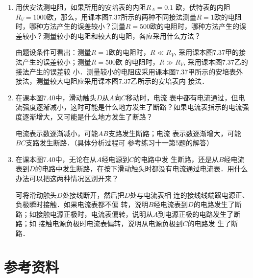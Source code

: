 \begin{enumerate}
\begin{solution}
\end{solution}

\item 用伏安法测电阻，如果所用的安培表的内阻$R_A=0.1$
欧，伏特表的内阻$R_V=1000$欧，那么，用课本图7.37所示的两种不同接法测量$R=1$欧的电阻时，哪种方法产生的误差较小？测量$R=500$欧的电阻时，哪种方法产生的误差较小？测量较小的电阻和较大的电阻，各应采用什么方法？

\begin{solution}
    由题设条件可看出：测量$R=1$欧的电阻时，$R\ll R_V$,
    采用课本图7.37甲的接法产生的误差较小；测量$R=500$欧
    的电阻时，$R\gg R_V$, 采用课本图7.37乙的接法产生的误差较
    小．测量较小的电阻应采用课本图7.37甲所示的安培表外
    接法，测量较大电阻应采用课本图7.37乙所示的安培表内
    接法．
\end{solution}

\item 在课本图7.40中，滑动触头$D$从$A$向$C$移动时，电流
表中都有电流通过，但电流强度逐渐减小，这时可能是什么地方发生了断路？如果电流表指示的电流强度逐渐增大，又可能是什么地方发生了断路？

\begin{solution}
    电流表示数逐渐减小，可能$AB$支路发生断路；电流
    表示数逐渐增大，可能$BC$支路发生断路．（具体分析过程可
    参考练习十一第5题的解答）
\end{solution}

\item 在课本图7.40中，无论在从$A$经电源到$C$的电路中发
生断路，还是从$B$经电流表到$D$的电路中发生断路，在按下滑动触头时都没有电流通过电流表．用什么办法可以把这两种情况区别开来？

\begin{solution}
    可将滑动触头$D$处接线断开，然后把$D$处与电流表相
    连的接线线端跟电源正、负极瞬时接触．如果电流表都不偏
    转，说明$B$经电流表到$D$的电路发生了断路；如接触电源正极时，电流表偏转，说明从$A$到电源正极的电路发生了断路；如
    接触电源负极时电流表偏转，说明从电源负极到$C$的电路发
    生了断路．
\end{solution}

\end{enumerate}



\section{参考资料}
